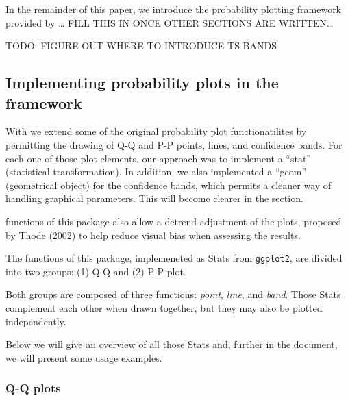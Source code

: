 In the remainder of this paper, we introduce the probability plotting
framework provided by \ldots{} FILL THIS IN ONCE OTHER
SECTIONS ARE WRITTEN\ldots{}

TODO: FIGURE OUT WHERE TO INTRODUCE TS BANDS \citep{Aldor-Noiman2013-xw}

\subsection{\texorpdfstring{Implementing probability plots in the
framework}{Implementing probability plots in the  framework}}\label{implementing-probability-plots-in-the-framework}

With  we extend some of the original 
probability plot functionatilites by permitting the drawing of Q-Q and
P-P points, lines, and confidence bands. For each one of those plot
elements, our approach was to implement a  ``stat''
(statistical transformation). In addition, we also implemented a
 ``geom'' (geometrical object) for the confidence bands,
which permits a cleaner way of handling graphical parameters. This will
become clearer in the  section.

functions of this package also allow a detrend adjustment of the plots,
proposed by Thode (2002) to help reduce visual bias when assessing the
results.

The functions of this package, implemeneted as Stats from
\texttt{ggplot2}, are divided into two groups: (1) Q-Q and (2) P-P plot.

Both groups are composed of three functions: \emph{point}, \emph{line},
and \emph{band}. Those Stats complement each other when drawn together,
but they may also be plotted independently.

Below we will give an overview of all those Stats and, further in the
document, we will present some usage examples.

\subsubsection{Q-Q plots}\label{q-q-plots}

